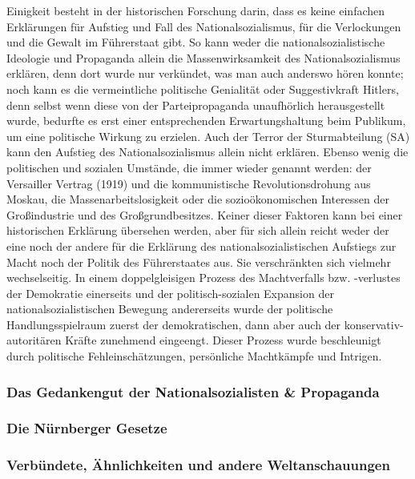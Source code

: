 \documentclass[letterpaper, 12pt]{article}
\let\tempsubsubsection\subsubsection
\renewcommand\subsubsection[1]{\vspace{0cm}\tempsubsubsection{#1}\vspace{0cm}}
\begin{document}
Einigkeit besteht in der historischen Forschung darin, dass es keine einfachen Erklärungen für Aufstieg und Fall des Nationalsozialismus, für die Verlockungen und die Gewalt im Führerstaat gibt. So kann weder die nationalsozialistische Ideologie und Propaganda allein die Massenwirksamkeit des Nationalsozialismus erklären, denn dort wurde nur verkündet, was man auch anderswo hören konnte; noch kann es die vermeintliche politische Genialität oder Suggestivkraft Hitlers, denn selbst wenn diese von der Parteipropaganda unaufhörlich herausgestellt wurde, bedurfte es erst einer entsprechenden Erwartungshaltung beim Publikum, um eine politische Wirkung zu erzielen. Auch der Terror der Sturmabteilung (SA) kann den Aufstieg des Nationalsozialismus allein nicht erklären. Ebenso wenig die politischen und sozialen Umstände, die immer wieder genannt werden: der Versailler Vertrag (1919) und die kommunistische Revolutionsdrohung aus Moskau, die Massenarbeitslosigkeit oder die sozioökonomischen Interessen der Großindustrie und des Großgrundbesitzes. Keiner dieser Faktoren kann bei einer historischen Erklärung übersehen werden, aber für sich allein reicht weder der eine noch der andere für die Erklärung des nationalsozialistischen Aufstiegs zur Macht noch der Politik des Führerstaates aus. Sie verschränkten sich vielmehr wechselseitig. In einem doppelgleisigen Prozess des Machtverfalls bzw. -verlustes der Demokratie einerseits und der politisch-sozialen Expansion der nationalsozialistischen Bewegung andererseits wurde der politische Handlungsspielraum zuerst der demokratischen, dann aber auch der konservativ-autoritären Kräfte zunehmend eingeengt. Dieser Prozess wurde beschleunigt durch politische Fehleinschätzungen, persönliche Machtkämpfe und Intrigen. 

\subsubsection{Das Gedankengut der Nationalsozialisten \& Propaganda}

\subsubsection{Die Nürnberger Gesetze}

\subsubsection{Verbündete, Ähnlichkeiten und andere Weltanschauungen}

\clearpage


\end{document}
